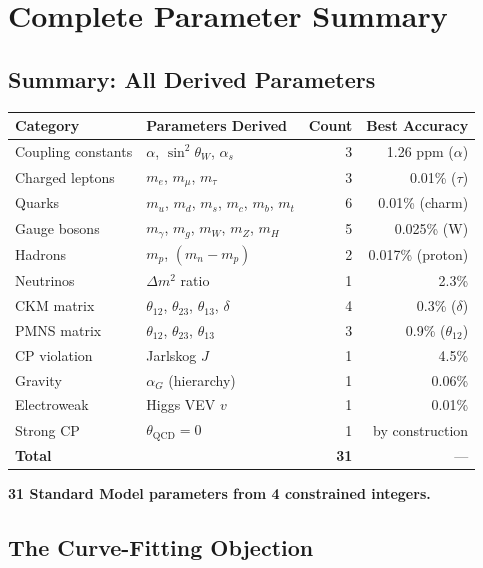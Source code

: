 \documentclass[11pt,a4paper]{article}
\theoremstyle{definition}
\theoremstyle{remark}
\begin{document}
\section{Complete Parameter Summary}

\subsection{Summary: All Derived Parameters}

\begin{center}
\begin{tabular}{llrr}
\toprule
Category & Parameters Derived & Count & Best Accuracy \\
\midrule
Coupling constants & $\alpha$, $\sin^2\theta_W$, $\alpha_s$ & 3 & 1.26 ppm ($\alpha$) \\
Charged leptons & $m_e$, $m_\mu$, $m_\tau$ & 3 & 0.01\% ($\tau$) \\
Quarks & $m_u$, $m_d$, $m_s$, $m_c$, $m_b$, $m_t$ & 6 & 0.01\% (charm) \\
Gauge bosons & $m_\gamma$, $m_g$, $m_W$, $m_Z$, $m_H$ & 5 & 0.025\% (W) \\
Hadrons & $m_p$, $(m_n - m_p)$ & 2 & 0.017\% (proton) \\
Neutrinos & $\Delta m^2$ ratio & 1 & 2.3\% \\
CKM matrix & $\theta_{12}$, $\theta_{23}$, $\theta_{13}$, $\delta$ & 4 & 0.3\% ($\delta$) \\
PMNS matrix & $\theta_{12}$, $\theta_{23}$, $\theta_{13}$ & 3 & 0.9\% ($\theta_{12}$) \\
CP violation & Jarlskog $J$ & 1 & 4.5\% \\
Gravity & $\alpha_G$ (hierarchy) & 1 & 0.06\% \\
Electroweak & Higgs VEV $v$ & 1 & 0.01\% \\
Strong CP & $\theta_{\text{QCD}} = 0$ & 1 & by construction \\
\midrule
\textbf{Total} & & \textbf{31} & --- \\
\bottomrule
\end{tabular}
\end{center}

\textbf{31 Standard Model parameters from 4 constrained integers.}

\subsection{The Curve-Fitting Objection}
\end{document}
